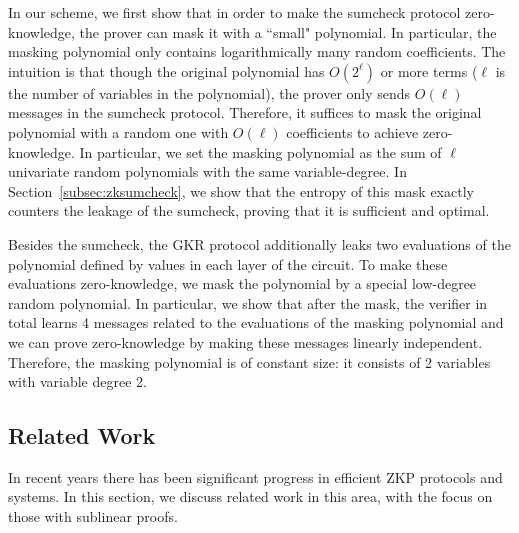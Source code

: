 In our scheme, we first show that in order to make the sumcheck protocol zero-knowledge, the prover can mask it with a ``small" polynomial. In particular, the masking polynomial only contains logarithmically many random coefficients. The intuition is that though the original polynomial has $O(2^\ell)$ or more terms ($\ell$ is the number of variables in the polynomial), the prover only sends $O(\ell)$ messages in the sumcheck protocol. Therefore, it suffices to mask the original polynomial with a random one with $O(\ell)$ coefficients to achieve zero-knowledge. In particular, we set the masking polynomial as the sum of $\ell$ univariate random polynomials with the same variable-degree. In Section~\ref{subsec:zksumcheck}, we show that the entropy of this mask exactly counters the leakage of the sumcheck, proving that it is sufficient and optimal.

Besides the sumcheck, the GKR protocol additionally leaks two evaluations of the polynomial defined by values in each layer of the circuit. To make these evaluations zero-knowledge, we mask the polynomial by a special low-degree random polynomial. In particular, we show that after the mask, the verifier in total learns 4 messages related to the evaluations of the masking polynomial and we can prove zero-knowledge by making these messages linearly independent. Therefore, the masking polynomial is of constant size: it consists of 2 variables with variable degree 2.


\subsection{Related Work}\label{subsec::related}
 In recent years there has been significant progress in efficient ZKP protocols and systems. In this section, we discuss related work in this area, with the focus on those with sublinear proofs. 

